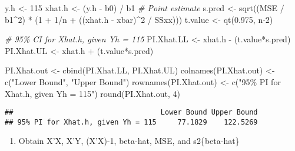 \documentclass[
]{article}
\newenvironment{Shaded}{\begin{snugshade}}{\end{snugshade}}
\newcommand{\CommentTok}[1]{\textcolor[rgb]{0.56,0.35,0.01}{\textit{#1}}}
\newcommand{\DecValTok}[1]{\textcolor[rgb]{0.00,0.00,0.81}{#1}}
\newcommand{\FloatTok}[1]{\textcolor[rgb]{0.00,0.00,0.81}{#1}}
\newcommand{\FunctionTok}[1]{\textcolor[rgb]{0.00,0.00,0.00}{#1}}
\newcommand{\NormalTok}[1]{#1}
\newcommand{\OtherTok}[1]{\textcolor[rgb]{0.56,0.35,0.01}{#1}}
\newcommand{\SpecialCharTok}[1]{\textcolor[rgb]{0.00,0.00,0.00}{#1}}
\newcommand{\StringTok}[1]{\textcolor[rgb]{0.31,0.60,0.02}{#1}}
\providecommand{\tightlist}{%
  \setlength{\itemsep}{0pt}\setlength{\parskip}{0pt}}
\begin{document}
\begin{Shaded}
\begin{Highlighting}[]
\NormalTok{y.h }\OtherTok{\textless{}{-}} \DecValTok{115}
\NormalTok{xhat.h }\OtherTok{\textless{}{-}}\NormalTok{ (y.h }\SpecialCharTok{{-}}\NormalTok{ b0) }\SpecialCharTok{/}\NormalTok{ b1 }\CommentTok{\# Point estimate}
\NormalTok{s.pred }\OtherTok{\textless{}{-}} \FunctionTok{sqrt}\NormalTok{((MSE }\SpecialCharTok{/}\NormalTok{ b1}\SpecialCharTok{\^{}}\DecValTok{2}\NormalTok{) }\SpecialCharTok{*}\NormalTok{ (}\DecValTok{1} \SpecialCharTok{+} \DecValTok{1}\SpecialCharTok{/}\NormalTok{n }\SpecialCharTok{+}\NormalTok{ ((xhat.h }\SpecialCharTok{{-}}\NormalTok{ xbar)}\SpecialCharTok{\^{}}\DecValTok{2} \SpecialCharTok{/}\NormalTok{ SSxx)))}
\NormalTok{t.value }\OtherTok{\textless{}{-}} \FunctionTok{qt}\NormalTok{(}\FloatTok{0.975}\NormalTok{, n}\DecValTok{{-}2}\NormalTok{)}

\CommentTok{\# 95\% CI for Xhat.h, given Yh = 115}
\NormalTok{PI.Xhat.LL }\OtherTok{\textless{}{-}}\NormalTok{ xhat.h }\SpecialCharTok{{-}}\NormalTok{ (t.value}\SpecialCharTok{*}\NormalTok{s.pred)}
\NormalTok{PI.Xhat.UL }\OtherTok{\textless{}{-}}\NormalTok{ xhat.h }\SpecialCharTok{+}\NormalTok{ (t.value}\SpecialCharTok{*}\NormalTok{s.pred)}

\NormalTok{PI.Xhat.out }\OtherTok{\textless{}{-}} \FunctionTok{cbind}\NormalTok{(PI.Xhat.LL, PI.Xhat.UL)}
\FunctionTok{colnames}\NormalTok{(PI.Xhat.out) }\OtherTok{\textless{}{-}} \FunctionTok{c}\NormalTok{(}\StringTok{"Lower Bound"}\NormalTok{, }\StringTok{"Upper Bound"}\NormalTok{)}
\FunctionTok{rownames}\NormalTok{(PI.Xhat.out) }\OtherTok{\textless{}{-}} \FunctionTok{c}\NormalTok{(}\StringTok{"95\% PI for Xhat.h, given Yh = 115"}\NormalTok{)}
\FunctionTok{round}\NormalTok{(PI.Xhat.out, }\DecValTok{4}\NormalTok{)}
\end{Highlighting}
\end{Shaded}

\begin{verbatim}
##                                   Lower Bound Upper Bound
## 95% PI for Xhat.h, given Yh = 115     77.1829    122.5269
\end{verbatim}

\begin{enumerate}
\def\labelenumi{\alph{enumi})}
\setcounter{enumi}{12}
\tightlist
\item
  Obtain X'X, X'Y, (X'X)-1, beta-hat, MSE, and s2\{beta-hat\}
\end{enumerate}
\end{document}
